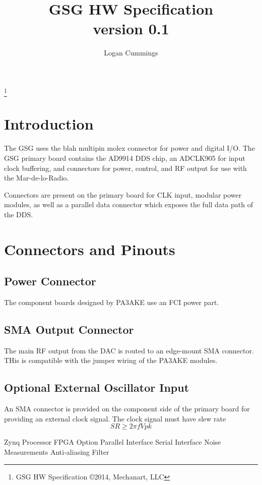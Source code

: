 \documentclass[letterpaper,12pt]{article}
\title{GSG HW Specification \\ \vspace{2 mm} {\large version 0.1}}
\author{Logan Cummings}
\begin{document}
\maketitle
\renewcommand*\footnoterule{}
\let\thefootnote\relax\footnote{GSG \hfill HW Specification  \hfill {\copyright{2014, Mechanart, LLC}}}
\newpage
\tableofcontents

\section{Introduction}

The GSG uses the blah multipin molex connector for power and digital I/O.
The GSG primary board contains the AD9914 DDS chip, an ADCLK905 for input clock 
buffering, and connectors for power, control, and RF output for use with the 
Mar-de-lo-Radio.

Connectors are present on the primary board for CLK input, modular power 
modules, as well as a parallel data connector which exposes the full data path 
of the DDS. 

\section{Connectors and Pinouts}
\subsection{Power Connector}
The component boards designed by PA3AKE use an FCI power part.

\subsection{SMA Output Connector} 
The main RF output from the DAC is routed to an edge-mount SMA connector. 
THis is compatible with the jumper wiring of the PA3AKE modules.

\subsection{Optional External Oscillator Input}
An SMA connector is provided on the component side of the primary board 
for providing an external clock signal. The clock signal must have slew rate 
\[
  SR \geq 2\pi f  Vpk
\]

Zynq Processor FPGA Option
Parallel Interface 
Serial Interface 
Noise Measurements
Anti-aliasing Filter
\end{document}
